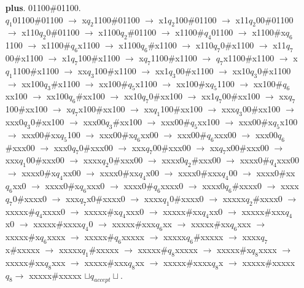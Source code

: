 \documentclass[12pt]{letter}
\begin{document}
\begin{enumerate}
\begin{enumerate}
	\item[\textbf{plus}.] 01100\#01100. \\
	$q_1$01100\#01100 $\rightarrow$ x$q_2$1100\#01100 $\rightarrow$ x1$q_2$100\#01100 $\rightarrow$ x11$q_2$00\#01100 $\rightarrow$ x110$q_2$0\#01100 $\rightarrow$ x1100$q_2$\#01100 $\rightarrow$ x1100\#$q_4$01100 $\rightarrow$ x1100\#x$q_6$1100 $\rightarrow$ x1100\#$q_6$x1100 $\rightarrow$ x1100$q_6$\#x1100 $\rightarrow$ x110$q_7$0\#x1100 $\rightarrow$ x11$q_7$00\#x1100 $\rightarrow$ x1$q_7$100\#x1100 $\rightarrow$ x$q_7$1100\#x1100 $\rightarrow$ $q_7$x1100\#x1100 $\rightarrow$ x$q_1$1100\#x1100 $\rightarrow$ xx$q_3$100\#x1100 $\rightarrow$ xx1$q_3$00\#x1100 $\rightarrow$ xx10$q_3$0\#x1100 $\rightarrow$ xx100$q_3$\#x1100 $\rightarrow$ xx100\#$q_5$x1100 $\rightarrow$ xx100\#x$q_5$1100 $\rightarrow$ xx100\#$q_6$xx100 $\rightarrow$ xx100$q_6$\#xx100 $\rightarrow$ xx10$q_7$0\#xx100 $\rightarrow$ xx1$q_7$00\#xx100 $\rightarrow$ xx$q_7$100\#xx100 $\rightarrow$ x$q_7$x100\#xx100 $\rightarrow$ xx$q_1$100\#xx100 $\rightarrow$ xxx$q_3$00\#xx100 $\rightarrow$ xxx0$q_3$0\#xx100 $\rightarrow$ xxx00$q_3$\#xx100 $\rightarrow$ xxx00\#$q_5$xx100 $\rightarrow$ xxx00\#x$q_5$x100 $\rightarrow$ xxx00\#xx$q_5$100 $\rightarrow$ xxx00\#x$q_6$xx00 $\rightarrow$ xxx00\#$q_6$xxx00 $\rightarrow$ xxx00$q_6$\#xxx00 $\rightarrow$ xxx0$q_7$0\#xxx00 $\rightarrow$ xxx$q_7$00\#xxx00 $\rightarrow$ xx$q_7$x00\#xxx00 $\rightarrow$ xxx$q_1$00\#xxx00 $\rightarrow$ xxxx$q_2$0\#xxx00 $\rightarrow$ xxxx0$q_2$\#xxx00 $\rightarrow$ xxxx0\#$q_4$xxx00 $\rightarrow$ xxxx0\#x$q_4$xx00 $\rightarrow$ xxxx0\#xx$q_4$x00 $\rightarrow$ xxxx0\#xxx$q_4$00 $\rightarrow$ xxxx0\#xx$q_6$xx0 $\rightarrow$ xxxx0\#x$q_6$xxx0 $\rightarrow$ xxxx0\#$q_6$xxxx0 $\rightarrow$ xxxx0$q_6$\#xxxx0 $\rightarrow$ xxxx$q_7$0\#xxxx0 $\rightarrow$ xxx$q_7$x0\#xxxx0 $\rightarrow$ xxxx$q_1$0\#xxxx0 $\rightarrow$ xxxxx$q_2$\#xxxx0 $\rightarrow$ xxxxx\#$q_4$xxxx0 $\rightarrow$ xxxxx\#x$q_4$xxx0 $\rightarrow$ xxxxx\#xx$q_4$xx0 $\rightarrow$ xxxxx\#xxx$q_4$x0 $\rightarrow$ xxxxx\#xxxx$q_4$0 $\rightarrow$ xxxxx\#xxx$q_6$xx $\rightarrow$ xxxxx\#xx$q_6$xxx $\rightarrow$ xxxxx\#x$q_6$xxxx $\rightarrow$ xxxxx\#$q_6$xxxxx $\rightarrow$ xxxxx$q_6$\#xxxxx $\rightarrow$ xxxx$q_7$x\#xxxxx $\rightarrow$ xxxxx$q_1$\#xxxxx $\rightarrow$ xxxxx\#$q_8$xxxxx $\rightarrow$ xxxxx\#x$q_8$xxxx $\rightarrow$ xxxxx\#xx$q_8$xxx $\rightarrow$ xxxxx\#xxx$q_8$xx $\rightarrow$ xxxxx\#xxxx$q_8$x $\rightarrow$ xxxxx\#xxxxx$q_8$\textvisiblespace $\rightarrow$ 
xxxxx\#xxxxx $\sqcup q_{accept}\sqcup.$


\end{enumerate}
\end{enumerate}
\end{document}
